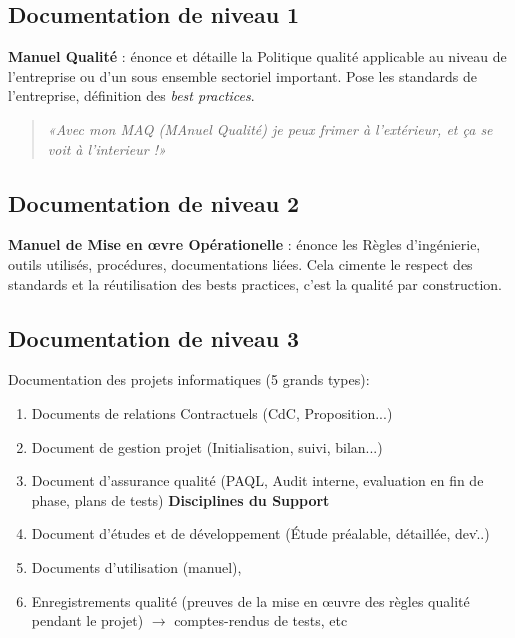 	\subsection{Documentation de niveau 1}

\textbf{Manuel Qualité} : énonce et détaille la Politique qualité applicable au niveau de l’entreprise ou d’un sous ensemble sectoriel important. 
Pose les standards de l’entreprise, définition des \textsl{best practices}.\\

\begin{quote}
\em «Avec mon MAQ (MAnuel Qualité) je peux frimer à l’extérieur, et ça se voit à l’interieur !»
\end{quote}
	\subsection{Documentation de niveau 2}

\textbf{Manuel de Mise en \oe{}vre Opérationelle} : énonce les Règles d’ingénierie, outils utilisés, procédures, documentations liées.
Cela cimente le respect des standards et la réutilisation des bests practices, c’est la qualité par construction.

	\subsection{Documentation de niveau 3}

Documentation des projets informatiques (5 grands types): \\
 
\begin{enumerate}
\item Documents de relations Contractuels (CdC, Proposition...)
\item Document de gestion projet (Initialisation, suivi, bilan...)
\item Document d’assurance qualité (PAQL, Audit interne, evaluation en fin de phase, plans de tests) \textbf{Disciplines du Support}
\item Document d’études et de développement (Étude préalable, détaillée, dev\...)
\item Documents d’utilisation (manuel), 
\item Enregistrements qualité (preuves de la mise en \oe{}uvre des règles qualité pendant le projet) $\rightarrow$ comptes-rendus de tests, etc
\end{enumerate}

